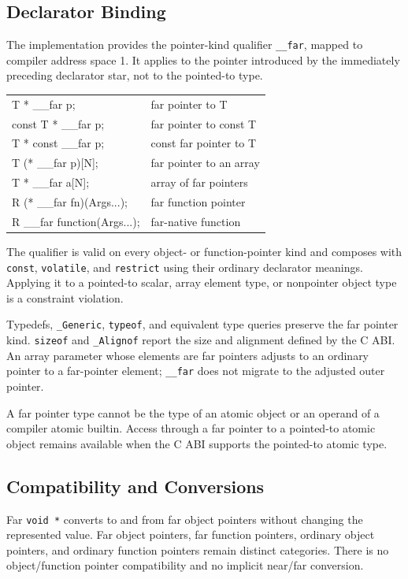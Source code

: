 \documentclass[10pt,twoside]{article}
\begin{document}
\subsection{Declarator Binding}
The implementation provides the pointer-kind qualifier \texttt{\_\_far},
mapped to compiler address space 1. It applies to the pointer introduced by the
immediately preceding declarator star, not to the pointed-to type.

\begingroup\small\ttfamily
\begin{tabularx}{\linewidth}{@{}lX@{}}
T * \_\_far p; & far pointer to T\\
const T * \_\_far p; & far pointer to const T\\
T * const \_\_far p; & const far pointer to T\\
T (* \_\_far p)[N]; & far pointer to an array\\
T * \_\_far a[N]; & array of far pointers\\
R (* \_\_far fn)(Args...); & far function pointer\\
R \_\_far function(Args...); & far-native function\\
\end{tabularx}
\endgroup

The qualifier is valid on every object- or function-pointer kind and composes
with \texttt{const}, \texttt{volatile}, and \texttt{restrict} using their
ordinary declarator meanings. Applying it to a pointed-to scalar, array
element type, or nonpointer object type is a constraint violation.

Typedefs, \texttt{\_Generic}, \texttt{typeof}, and equivalent type queries
preserve the far pointer kind. \texttt{sizeof} and \texttt{\_Alignof} report
the size and alignment defined by the C ABI. An array parameter whose elements
are far pointers adjusts to an ordinary pointer to a far-pointer element;
\texttt{\_\_far} does not migrate to the adjusted outer pointer.

A far pointer type cannot be the type of an atomic object or an operand of a
compiler atomic builtin. Access through a far pointer to a pointed-to atomic
object remains available when the C ABI supports the pointed-to atomic type.

\subsection{Compatibility and Conversions}
Far \texttt{void *} converts to and from far object pointers without changing
the represented value. Far object pointers, far function pointers, ordinary
object pointers, and ordinary function pointers remain distinct categories.
There is no object/function pointer compatibility and no implicit near/far
conversion.
\end{document}
